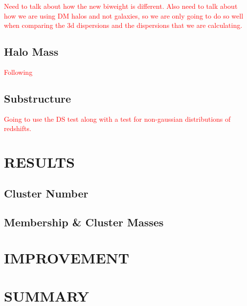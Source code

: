 \documentclass[apj, revtex4]{emulateapj}
\newcommand{\editorial}[1]{\textcolor{red}{#1} }
\begin{document}
\editorial{Need to talk about how the new biweight is different. Also need to talk about how we are using DM halos and not galaxies, so we are only going to do so well when comparing the 3d dispersions and the dispersions that we are calculating.}





\subsection{Halo Mass}

\editorial{Following \cite{Evrard2008, VanderBurg2014, Sifon2013}}

\subsection{Substructure}

\editorial{Going to use the DS test along with a test for non-gaussian distributions of redshifts.}

\section{RESULTS}
\subsection{Cluster Number}
\subsection{Membership \& Cluster Masses}

\section{IMPROVEMENT}
\section{SUMMARY}


\end{document}
